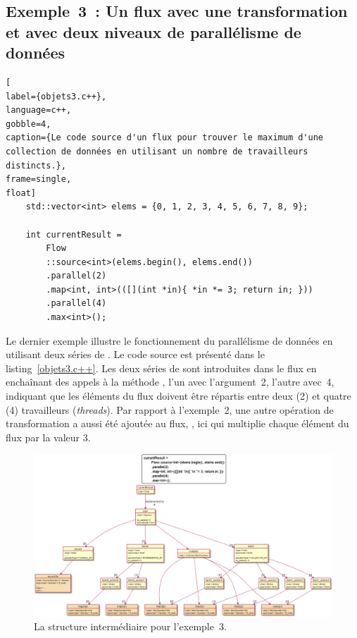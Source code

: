 \subsection{Exemple~3~: Un flux avec une transformation et avec deux niveaux de parallélisme de données}


\begin{lstlisting}[
label={objets3.c++},
language=c++,
gobble=4,
caption={Le code source d'un flux pour trouver le maximum d'une collection de données en utilisant un nombre de travailleurs distincts.},
frame=single,
float]
    std::vector<int> elems = {0, 1, 2, 3, 4, 5, 6, 7, 8, 9};

    int currentResult =
        Flow
        ::source<int>(elems.begin(), elems.end())
        .parallel(2)
        .map<int, int>(([](int *in){ *in *= 3; return in; }))
        .parallel(4)
        .max<int>();
\end{lstlisting}

Le dernier exemple illustre le fonctionnement du parallélisme de données en utilisant deux s\'eries de . Le code source est présenté dans le listing~\ref{objets3.c++}. Les deux s\'eries de  sont introduites dans le flux en encha\^inant des appels à la m\'ethode , l'un avec l'argument~2, l'autre avec~4, indiquant que les \'el\'ements du flux doivent être r\'epartis entre deux (2) et quatre (4) travailleurs (\emph{threads}). Par rapport à l'exemple~2, une autre opération de transformation a aussi \'et\'e ajout\'ee au flux, , ici qui multiplie chaque \'el\'ement du flux par la valeur 3.



\begin{figure}
\centering
         \includegraphics[width=1.0\textwidth]{Figures/objets3-ppff.png}
      \caption{La structure interm\'ediaire  pour l'exemple~3.}
       \label{objets3-ppff.fig}
\end{figure}

